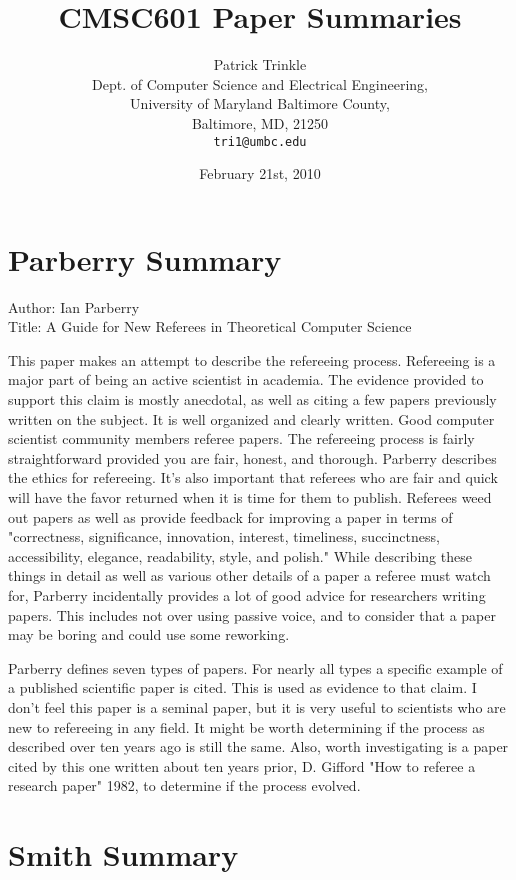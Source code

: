 \documentclass[11pt]{article}
\title{CMSC601 Paper Summaries}
\author{Patrick Trinkle\\
Dept. of Computer Science and Electrical Engineering,\\
University of Maryland Baltimore County,\\
Baltimore, MD, 21250\\
\texttt{tri1@umbc.edu}}
\date{February 21st, 2010}
\begin{document}
\maketitle

\section{Parberry Summary}
Author: Ian Parberry\\
Title: A Guide for New Referees in Theoretical Computer Science

This paper makes an attempt to describe the refereeing process.  Refereeing is a major part of being an active scientist in academia.  The evidence provided to support this claim is mostly anecdotal, as well as citing a few papers previously written on the subject.  It is well organized and clearly written.  Good computer scientist community members referee papers.  The refereeing process is fairly straightforward provided you are fair, honest, and thorough.  Parberry describes the ethics for refereeing.  It's also important that referees who are fair and quick will have the favor returned when it is time for them to publish.  Referees weed out papers as well as provide feedback for improving a paper in terms of "correctness, significance, innovation, interest, timeliness, succinctness, accessibility, elegance, readability, style, and polish."\cite{Parberry1994}  While describing these things in detail as well as various other details of a paper a referee must watch for, Parberry incidentally provides a lot of good advice for researchers writing papers.  This includes not over using passive voice, and to consider that a paper may be boring and could use some reworking.

Parberry defines seven types of papers.  For nearly all types a specific example of a published scientific paper is cited.  This is used as evidence to that claim.  I don't feel this paper is a seminal paper, but it is very useful to scientists who are new to refereeing in any field.  It might be worth determining if the process as described over ten years ago is still the same.  Also, worth investigating is a paper cited by this one written about ten years prior, D. Gifford "How to referee a research paper"  1982,  to determine if the process evolved.

\section{Smith Summary}
\end{document}

